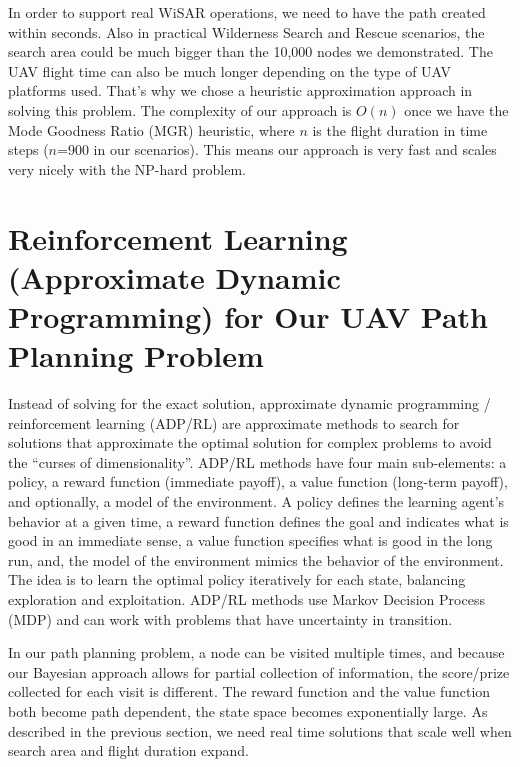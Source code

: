 In order to support real WiSAR operations, we need to have the path created within seconds. Also in practical Wilderness Search and Rescue scenarios, the search area could be much bigger than the 10,000 nodes we demonstrated. The UAV flight time can also be much longer depending on the type of UAV platforms used. That's why we chose a heuristic approximation approach in solving this problem. The complexity of our approach is $O(n)$ once we have the Mode Goodness Ratio (MGR) heuristic, where $n$ is the flight duration in time steps ($n$=900 in our scenarios). This means our approach is very fast and scales very nicely with the NP-hard problem.


\section{Reinforcement Learning (Approximate Dynamic Programming) for Our UAV Path Planning Problem}
\label{RLUAV}

Instead of solving for the exact solution, approximate dynamic programming / reinforcement learning (ADP/RL) are approximate methods to search for solutions that approximate the optimal solution for complex problems to avoid the ``curses of dimensionality''. ADP/RL methods have four main sub-elements: a policy, a reward function (immediate payoff), a value function (long-term payoff), and optionally, a model of the environment. A policy defines the learning agent's behavior at a given time, a reward function defines the goal and indicates what is good in an immediate sense, a value function specifies what is good in the long run, and, the model of the environment mimics the behavior of the environment. The idea is to learn the optimal policy iteratively for each state, balancing exploration and exploitation. ADP/RL methods use Markov Decision Process (MDP) and can work with problems that have uncertainty in transition.

In our path planning problem, a node can be visited multiple times, and because our Bayesian approach allows for partial collection of information, the score/prize collected for each visit is different. The reward function and the value function both become path dependent, the state space becomes exponentially large. As described in the previous section, we need real time solutions that scale well when search area and flight duration expand.

